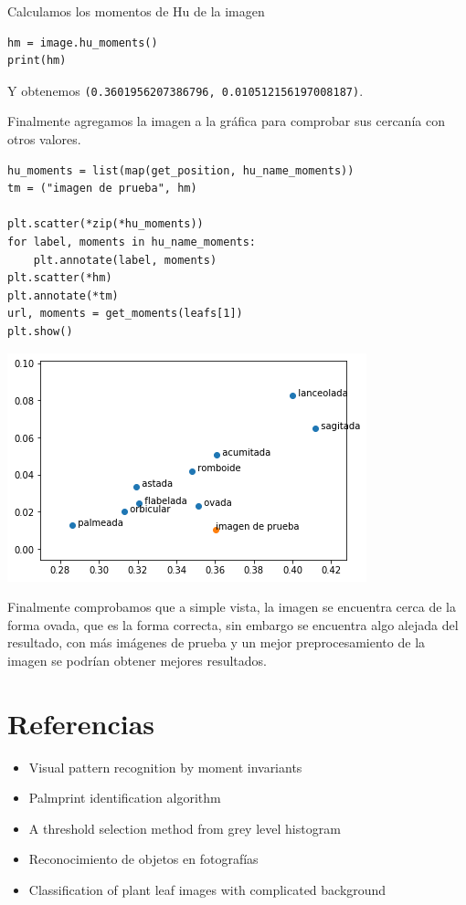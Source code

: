 \documentclass[letter]{article}
\begin{document}
Calculamos los momentos de Hu de la imagen

\begin{verbatim}
hm = image.hu_moments()
print(hm)
\end{verbatim}

Y obtenemos \texttt{(0.3601956207386796, 0.010512156197008187)}.

Finalmente agregamos la imagen a la gráfica para comprobar sus cercanía con
otros valores.

\begin{verbatim}
hu_moments = list(map(get_position, hu_name_moments))
tm = ("imagen de prueba", hm)

plt.scatter(*zip(*hu_moments))
for label, moments in hu_name_moments:
    plt.annotate(label, moments)
plt.scatter(*hm)
plt.annotate(*tm)
url, moments = get_moments(leafs[1])
plt.show()
\end{verbatim}

\begin{center}
\includegraphics[width=.9\linewidth]{./images/result.png}
\end{center}

Finalmente comprobamos que a simple vista, la imagen se encuentra cerca de la
forma ovada, que es la forma correcta, sin embargo se encuentra algo alejada del
resultado, con más imágenes de prueba y un mejor preprocesamiento de la imagen
se podrían obtener mejores resultados.

\section{Referencias}
\label{sec:orgd68823f}
\begin{itemize}
\item Visual pattern recognition by moment invariants
\item Palmprint identification algorithm
\item A threshold selection method from grey level histogram
\item Reconocimiento de objetos en fotografías
\item Classification of plant leaf images with complicated background
\end{itemize}
\end{document}
